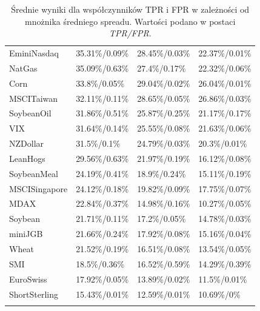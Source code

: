 \documentclass[a4paper,12pt,openany, DIV=calc, headsepline]{scrbook}
\begin{document}
\begin{longtable}{llll}
  EminiNasdaq & 35.31\%/0.09\% & 28.45\%/0.03\% & 22.37\%/0.01\% \\ 
  NatGas & 35.09\%/0.63\% & 27.4\%/0.17\% & 22.32\%/0.06\% \\ 
  Corn & 33.8\%/0.05\% & 29.04\%/0.02\% & 26.04\%/0.01\% \\ 
  MSCITaiwan & 32.11\%/0.11\% & 28.65\%/0.05\% & 26.86\%/0.03\% \\ 
  SoybeanOil & 31.86\%/0.51\% & 25.87\%/0.25\% & 21.17\%/0.17\% \\ 
  VIX & 31.64\%/0.14\% & 25.55\%/0.08\% & 21.63\%/0.06\% \\ 
  NZDollar & 31.5\%/0.1\% & 24.79\%/0.03\% & 20.3\%/0.01\% \\ 
  LeanHogs & 29.56\%/0.63\% & 21.97\%/0.19\% & 16.12\%/0.08\% \\ 
  SoybeanMeal & 24.19\%/0.41\% & 18.9\%/0.24\% & 15.11\%/0.19\% \\ 
  MSCISingapore & 24.12\%/0.18\% & 19.82\%/0.09\% & 17.75\%/0.07\% \\ 
  MDAX & 22.84\%/0.37\% & 14.98\%/0.16\% & 10.27\%/0.05\% \\ 
  Soybean & 21.71\%/0.11\% & 17.2\%/0.05\% & 14.78\%/0.03\% \\ 
  miniJGB & 21.66\%/0.24\% & 17.92\%/0.08\% & 15.16\%/0.04\% \\ 
  Wheat & 21.52\%/0.19\% & 16.51\%/0.08\% & 13.54\%/0.05\% \\ 
  SMI & 18.5\%/0.36\% & 16.52\%/0.59\% & 14.29\%/0.39\% \\ 
  EuroSwiss & 17.92\%/0.05\% & 13.89\%/0.02\% & 11.5\%/0.01\% \\ 
  ShortSterling & 15.43\%/0.01\% & 12.59\%/0.01\% & 10.69\%/0\% \\ 
   \hline
   \caption{Średnie wyniki dla współczynników TPR i FPR w zależności od mnożnika średniego spreadu. Wartości podano w postaci \emph{TPR/FPR}.}
\label{tab:result1}

\end{longtable}
\end{document}
